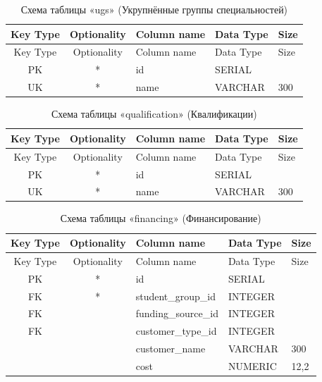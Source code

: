 \begin{xltabular}{\textwidth}{|c|c|l|l|X|}
	\caption{Схема таблицы «ugs» (Укрупнённые группы специальностей)\label{tab:ugs}}\\ \hline
	\centrow Key Type & \centrow Optionality & \centrow Column name & \centrow Data Type & \centrow Size \\ \hline
	\endfirsthead
	\centrow Key Type & \centrow Optionality & \centrow Column name & \centrow Data Type & \centrow Size \\ \hline
	\finishhead
	PK & * & id & SERIAL & \\ \hline
	UK & * & name & VARCHAR & 300 \\ \hline
\end{xltabular}

\begin{xltabular}{\textwidth}{|c|c|l|l|X|}
	\caption{Схема таблицы «qualification» (Квалификации)\label{tab:qualification}}\\ \hline
	\centrow Key Type & \centrow Optionality & \centrow Column name & \centrow Data Type & \centrow Size \\ \hline
	\endfirsthead
	\centrow Key Type & \centrow Optionality & \centrow Column name & \centrow Data Type & \centrow Size \\ \hline
	\finishhead
	PK & * & id & SERIAL & \\ \hline
	UK & * & name & VARCHAR & 300 \\ \hline
\end{xltabular}

\begin{xltabular}{\textwidth}{|c|c|l|l|X|}
	\caption{Схема таблицы «financing» (Финансирование)\label{tab:financing}}\\ \hline
	\centrow Key Type & \centrow Optionality & \centrow Column name & \centrow Data Type & \centrow Size \\ \hline
	\endfirsthead
	\centrow Key Type & \centrow Optionality & \centrow Column name & \centrow Data Type & \centrow Size \\ \hline
	\finishhead
	PK & * & id & SERIAL & \\ \hline
	FK & * & student\_group\_id & INTEGER & \\ \hline
	FK & & funding\_source\_id & INTEGER & \\ \hline
	FK & & customer\_type\_id & INTEGER & \\ \hline
	& & customer\_name & VARCHAR & 300 \\ \hline
	& & cost & NUMERIC & 12,2 \\ \hline
\end{xltabular}

